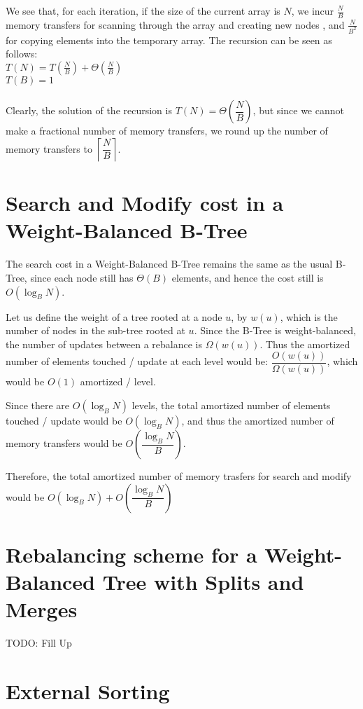 \documentclass{article}
\begin{document}
We see that, for each iteration, if the size of the current array is $N$, we incur
$\frac{N}{B}$ memory transfers for scanning through the array and creating new nodes
, and $\frac{N}{B^2}$ for copying elements into the temporary array. The recursion
can be seen as follows:\\

$T(N) = T(\frac{N}{B}) + \Theta(\frac{N}{B})$ \\
$T(B) = 1$\\
\\
Clearly, the solution of the recursion is $T(N) = \Theta\left(\dfrac{N}{B}\right)$, but since we cannot
make a fractional number of memory transfers, we round up the number of memory transfers
to $\left\lceil \dfrac{N}{B} \right\rceil$.

\clearpage

\clearpage

\section {Search and Modify cost in a Weight-Balanced B-Tree}
The search cost in a Weight-Balanced B-Tree remains the same as the usual
B-Tree, since each node still has $\Theta(B)$ elements, and hence the cost still is
$O(\log_B{N})$.

Let us define the weight of a tree rooted at a node $u$, by $w(u)$, which is the
number of nodes in the sub-tree rooted at $u$. Since the B-Tree is weight-balanced,
the number of updates between a rebalance is $\Omega(w(u))$. Thus the 
amortized number of elements touched / update at each level would be: 
$\dfrac{O(w(u))}{\Omega(w(u))}$, which would be $O(1)$ amortized / level. 

Since there are $O(\log_B{N})$ levels, the total amortized number of elements 
touched / update would be $O(\log_B{N})$, and thus the amortized number of memory transfers
would be $O\left(\dfrac{\log_B{N}}{B}\right)$.

Therefore, the total amortized number of memory trasfers for search and modify would
be $O(\log_B{N}) + O\left(\dfrac{\log_B{N}}{B}\right)$
\clearpage

\section {Rebalancing scheme for a Weight-Balanced Tree with Splits and Merges}
TODO: Fill Up

\clearpage

\section{External Sorting}
\end{document}
